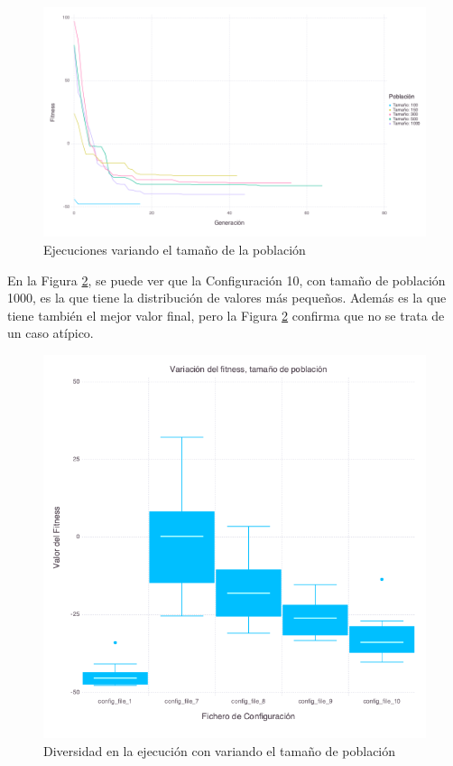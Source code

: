 \begin{figure}[]
	\centering	
	\includegraphics[scale=0.5]{figuras/population_size_variation.png}
	\caption{ Ejecuciones variando el tamaño de la población }
    \label{fig:population_size_variation}
\end{figure}

En la Figura \ref{fig:population_size_box_plots}, se puede ver que la Configuración 10, con tamaño de población 1000, es
la que tiene la distribución de valores más pequeños. Además es la que tiene también el mejor valor final, pero la
Figura \ref{fig:population_size_box_plots} confirma que no se trata de un caso atípico.

\begin{figure}[]
	\centering	
	\includegraphics[scale=0.5]{figuras/Rastrigin_box_plots_p_size.png}
	\caption{ Diversidad en la ejecución con variando el tamaño de población }
    \label{fig:population_size_box_plots}
\end{figure}



